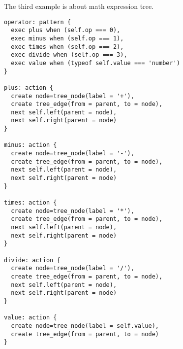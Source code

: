The third example is about math expression tree.

\begin{lstlisting}
operator: pattern {
  exec plus when (self.op === 0),
  exec minus when (self.op === 1),
  exec times when (self.op === 2),
  exec divide when (self.op === 3),
  exec value when (typeof self.value === 'number')
}

plus: action {
  create node=tree_node(label = '+'),
  create tree_edge(from = parent, to = node),
  next self.left(parent = node),
  next self.right(parent = node)
}

minus: action {
  create node=tree_node(label = '-'),
  create tree_edge(from = parent, to = node),
  next self.left(parent = node),
  next self.right(parent = node)
}

times: action {
  create node=tree_node(label = '*'),
  create tree_edge(from = parent, to = node),
  next self.left(parent = node),
  next self.right(parent = node)
}

divide: action {
  create node=tree_node(label = '/'),
  create tree_edge(from = parent, to = node),
  next self.left(parent = node),
  next self.right(parent = node)
}

value: action {
  create node=tree_node(label = self.value),
  create tree_edge(from = parent, to = node)
}
\end{lstlisting}
